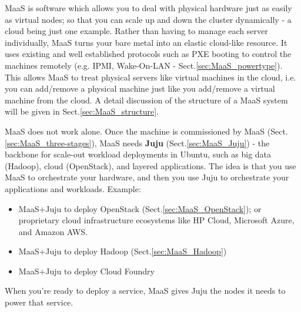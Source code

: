 MaaS is software which allows you to deal with physical hardware just as easily
as virtual nodes; so that you can scale up and down the cluster dynamically - a
cloud being just one example. Rather than having to manage each server
individually, MaaS turns your bare metal into an elastic cloud-like resource. It
uses existing and well established protocols such as PXE booting to control the
machines remotely (e.g. IPMI, Wake-On-LAN - Sect.\ref{sec:MaaS_powertype}).
This allows MaaS to treat physical servers like virtual machines in the cloud,
i.e. you can add/remove a physical machine just like you add/remove a virtual
machine from the cloud. A detail discussion of the structure of a MaaS system
will be given in Sect.\ref{sec:MaaS_structure}.


MaaS does not work alone. Once the machine is commissioned by MaaS
(Sect.\ref{sec:MaaS_three-stages}), MaaS needs {\bf Juju}
(Sect.\ref{sec:MaaS_Juju}) - the backbone for scale-out workload deployments in
Ubuntu, such as big data (Hadoop), cloud (OpenStack), and layered applications.
The idea is that you use MaaS to orchestrate your hardware, and then you use
Juju to orchestrate your applications and workloads. Example:
\begin{itemize}
  \item MaaS+Juju to deploy OpenStack (Sect.\ref{sec:MaaS_OpenStack}); or
  proprietary cloud infrastructure ecosystems like HP Cloud, Microsoft Azure,
  and Amazon AWS.
  
  \item MaaS+Juju to deploy Hadoop (Sect.\ref{sec:MaaS_Hadoop})
  
  \item MaaS+Juju to deploy Cloud Foundry 
\end{itemize}
When you're ready to deploy a service, MaaS gives Juju the nodes it needs to
power that service. 

